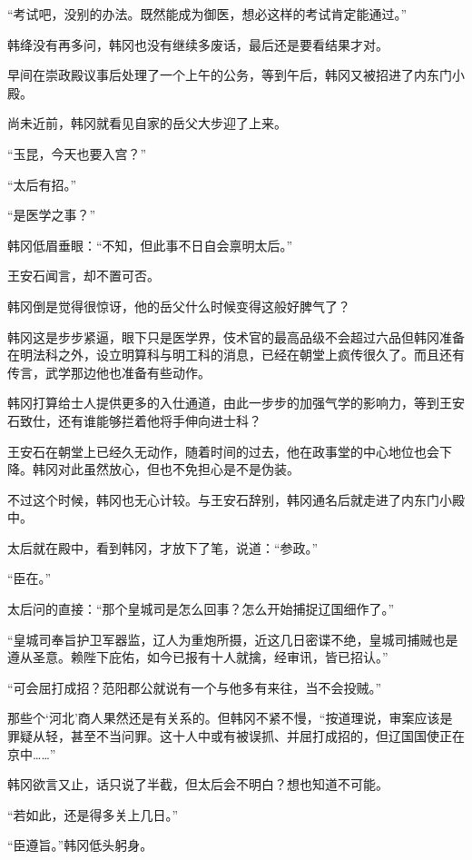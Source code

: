 “考试吧，没别的办法。既然能成为御医，想必这样的考试肯定能通过。”

韩绛没有再多问，韩冈也没有继续多废话，最后还是要看结果才对。

早间在崇政殿议事后处理了一个上午的公务，等到午后，韩冈又被招进了内东门小殿。

尚未近前，韩冈就看见自家的岳父大步迎了上来。

“玉昆，今天也要入宫？”

“太后有招。”

“是医学之事？”

韩冈低眉垂眼：“不知，但此事不日自会禀明太后。”

王安石闻言，却不置可否。

韩冈倒是觉得很惊讶，他的岳父什么时候变得这般好脾气了？

韩冈这是步步紧逼，眼下只是医学界，伎术官的最高品级不会超过六品但韩冈准备在明法科之外，设立明算科与明工科的消息，已经在朝堂上疯传很久了。而且还有传言，武学那边他也准备有些动作。

韩冈打算给士人提供更多的入仕通道，由此一步步的加强气学的影响力，等到王安石致仕，还有谁能够拦着他将手伸向进士科？

王安石在朝堂上已经久无动作，随着时间的过去，他在政事堂的中心地位也会下降。韩冈对此虽然放心，但也不免担心是不是伪装。

不过这个时候，韩冈也无心计较。与王安石辞别，韩冈通名后就走进了内东门小殿中。

太后就在殿中，看到韩冈，才放下了笔，说道：“参政。”

“臣在。”

太后问的直接：“那个皇城司是怎么回事？怎么开始捕捉辽国细作了。”

“皇城司奉旨护卫军器监，辽人为重炮所摄，近这几日密谍不绝，皇城司捕贼也是遵从圣意。赖陛下庇佑，如今已报有十人就擒，经审讯，皆已招认。”

“可会屈打成招？范阳郡公就说有一个与他多有来往，当不会投贼。”

那些个‘河北’商人果然还是有关系的。但韩冈不紧不慢，“按道理说，审案应该是罪疑从轻，甚至不当问罪。这十人中或有被误抓、并屈打成招的，但辽国国使正在京中……”

韩冈欲言又止，话只说了半截，但太后会不明白？想也知道不可能。

“若如此，还是得多关上几日。”

“臣遵旨。”韩冈低头躬身。
